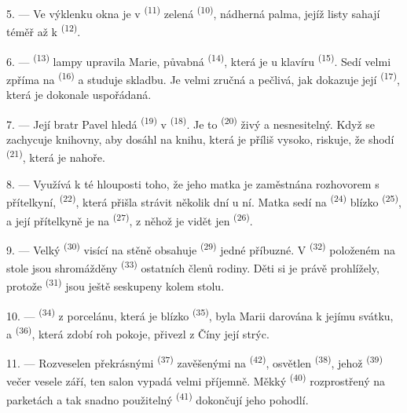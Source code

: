 5. --- Ve výklenku okna je v  \textsuperscript{(11)} zelená
 \textsuperscript{(10)}, nádherná palma, jejíž listy sahají téměř až k
 \textsuperscript{(12)}.

6. ---  \textsuperscript{(13)} lampy upravila Marie, půvabná
 \textsuperscript{(14)}, která je u klavíru \textsuperscript{(15)}. Sedí
velmi zpříma na  \textsuperscript{(16)} a studuje skladbu. Je velmi zručná a
pečlivá, jak dokazuje její  \textsuperscript{(17)}, která je dokonale
uspořádaná.

\VUsaut{5.0mm}
\VUsaut{3.0mm}

7. --- Její bratr Pavel hledá  \textsuperscript{(19)} v
 \textsuperscript{(18)}. Je to 
\textsuperscript{(20)} živý a nesnesitelný. Když se zachycuje knihovny, aby dosáhl na knihu,
která je příliš vysoko, riskuje, že shodí  \textsuperscript{(21)}, která je
nahoře.

8. --- Využívá k té hlouposti toho, že jeho matka je zaměstnána rozhovorem s přítelkyní,
 \textsuperscript{(22)}, která přišla strávit několik dní u ní. Matka sedí na
 \textsuperscript{(24)} blízko  \textsuperscript{(25)}, a její
přítelkyně je na  \textsuperscript{(27)}, z něhož je vidět jen
 \textsuperscript{(26)}.

9. --- Velký  \textsuperscript{(30)} visící na stěně obsahuje
 \textsuperscript{(29)} jedné příbuzné. V 
\textsuperscript{(32)} položeném na stole jsou shromážděny 
\textsuperscript{(33)} ostatních členů rodiny. Děti si je právě prohlížely, protože
 \textsuperscript{(31)} jsou ještě seskupeny kolem stolu.

10. ---  \textsuperscript{(34)} z porcelánu, která je blízko
 \textsuperscript{(35)}, byla Marii darována k jejímu svátku, a
 \textsuperscript{(36)}, která zdobí roh pokoje, přivezl z Číny její
strýc.

11. --- Rozveselen překrásnými  \textsuperscript{(37)} zavěšenými na
 \textsuperscript{(42)}, osvětlen 
\textsuperscript{(38)}, jehož  \textsuperscript{(39)} večer vesele
září, ten salon vypadá velmi příjemně. Měkký  \textsuperscript{(40)}
rozprostřený na parketách a tak snadno použitelný
 \textsuperscript{(41)} dokončují jeho pohodlí.

